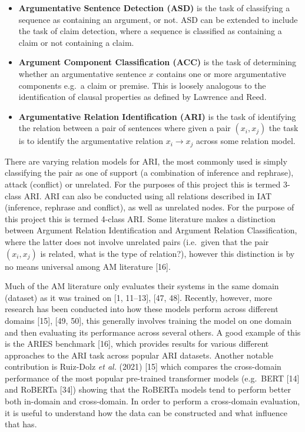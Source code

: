 \documentclass[twocolumn,twoside]{article}
\providecommand{\tightlist}{%
  \setlength{\itemsep}{0pt}\setlength{\parskip}{0pt}}
\begin{document}
\begin{itemize}
\tightlist
\item
  \textbf{Argumentative Sentence Detection (ASD)} is the task of
  classifying a sequence as containing an argument, or not. ASD can be
  extended to include the task of claim detection, where a sequence is
  classified as containing a claim or not containing a claim.
\item
  \textbf{Argument Component Classification (ACC)} is the task of
  determining whether an argumentative sentence \(x\) contains one or
  more argumentative components e.g.~a claim or premise. This is loosely
  analogous to the identification of clausal properties as defined by
  Lawrence and Reed.
\item
  \textbf{Argumentative Relation Identification (ARI)} is the task of
  identifying the relation between a pair of sentences where given a
  pair \((x_i, x_j)\) the task is to identify the argumentative relation
  \(x_i \rightarrow x_j\) across some relation model.
\end{itemize}

There are varying relation models for ARI, the most commonly used is
simply classifying the pair as one of support (a combination of
inference and rephrase), attack (conflict) or unrelated. For the
purposes of this project this is termed 3-class ARI. ARI can also be
conducted using all relations described in IAT (inference, rephrase and
conflict), as well as unrelated nodes. For the purpose of this project
this is termed 4-class ARI. Some literature makes a distinction between
Argument Relation Identification and Argument Relation Classification,
where the latter does not involve unrelated pairs (i.e.~given that the
pair \((x_i, x_j)\) is related, what is the type of relation?), however
this distinction is by no means universal among AM literature {[}16{]}.

Much of the AM literature only evaluates their systems in the same
domain (dataset) as it was trained on {[}1, 11--13{]},
{[}47, 48{]}. Recently, however, more research has been conducted
into how these models perform across different domains {[}15{]},
{[}49, 50{]}, this generally involves training the model on one
domain and then evaluating its performance across several others. A good
example of this is the ARIES benchmark {[}16{]}, which provides results
for various different approaches to the ARI task across popular ARI
datasets. Another notable contribution is Ruiz-Dolz \emph{et al.} (2021)
{[}15{]} which compares the cross-domain performance of the most popular
pre-trained transformer models (e.g.~BERT {[}14{]} and RoBERTa {[}34{]})
showing that the RoBERTa models tend to perform better both in-domain
and cross-domain. In order to perform a cross-domain evaluation, it is
useful to understand how the data can be constructed and what influence
that has.
\end{document}

